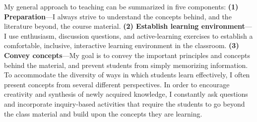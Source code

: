 My general approach to teaching can be summarized in five components:
\textbf{(1) Preparation}---I always strive to understand the concepts behind,
and the literature beyond, the course material.
\textbf{(2) Establish learning environment}---I use enthusiasm, discussion
questions, and active-learning exercises to establish a comfortable,
inclusive,
interactive learning environment in the classroom.
\textbf{(3) Convey concepts}---My goal is to convey the important principles
and concepts behind the material, and prevent students from simply memorizing
information.
To accommodate the diversity of ways in which students learn effectively, I
often present concepts from several different perspectives.
In order to encourage creativity and synthesis of newly acquired knowledge,
I constantly ask questions and incorporate inquiry-based activities that
require the students to go beyond the class material and build upon the
concepts they are learning.
